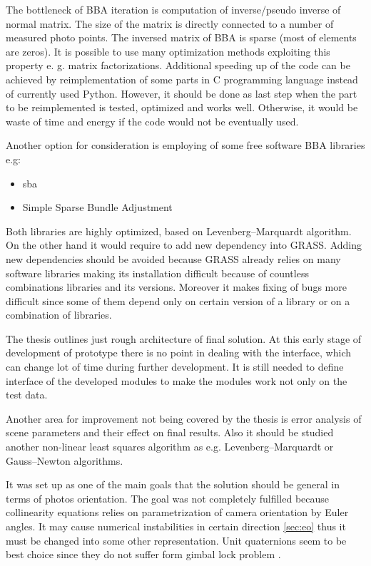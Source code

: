 \documentclass[a4paper,12pt]{article}
\begin{document}
The bottleneck of BBA iteration is computation of inverse/pseudo inverse of normal matrix.
The size of the matrix is directly connected to a number of measured photo points.
The inversed matrix of BBA is sparse (most of elements are zeros).
It is possible to use many optimization methods exploiting this property e. g. matrix factorizations. 
Additional speeding up of the code can be achieved by reimplementation of some parts in C programming language 
instead of currently used Python. However, it should be done 
as last step when the part to be reimplemented is tested, optimized and works well. Otherwise, it would be waste of time and energy if the 
code would not be eventually used. 


Another option  for consideration is employing of some free software BBA libraries e.g:
\begin{itemize}
\item sba 
\item Simple Sparse Bundle Adjustment 
\end{itemize}

Both libraries are highly optimized, based on Levenberg–Marquardt algorithm.
On the other hand it would require to add new dependency into GRASS. 
Adding new dependencies should be avoided because GRASS already relies on many software libraries
 making its installation difficult because of countless combinations libraries and its versions.
 Moreover it makes fixing of bugs more difficult since some of them
 depend only on certain version of  a library or on a combination of libraries. 
 
The thesis outlines just rough architecture of final solution. At this early stage of development of 
prototype
there is no point in dealing with the interface, which can change lot of time during further development.
It is still needed to define interface of the developed modules to make the modules work not only on the test data. 

Another area for improvement not being covered by the thesis is error analysis of scene parameters and their 
effect on final results. Also it should be studied another non-linear least squares algorithm as e.g. Levenberg–Marquardt or 
Gauss–Newton  algorithms. 

It was set up as one of the main goals that the solution should be general in terms of photos orientation.
The goal was not completely fulfilled because collinearity equations relies on parametrization of camera orientation by Euler angles.
It may cause numerical instabilities in certain direction \ref{sec:eo} thus it must be changed into some other representation.
Unit quaternions seem to be best choice since they do not suffer form gimbal lock problem \cite{schmidt2001using}.
\end{document}

